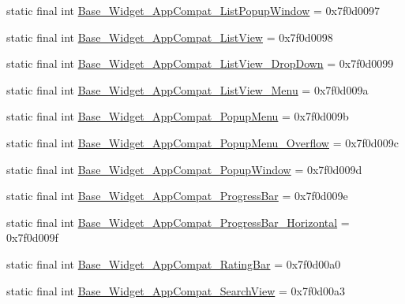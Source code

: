 \begin{DoxyCompactItemize}
\item 
static final int \mbox{\hyperlink{classcom_1_1google_1_1android_1_1gms_1_1R_1_1style_a2879810d1da9cff366d9760349a6dac1}{Base\+\_\+\+Widget\+\_\+\+App\+Compat\+\_\+\+List\+Popup\+Window}} = 0x7f0d0097
\item 
static final int \mbox{\hyperlink{classcom_1_1google_1_1android_1_1gms_1_1R_1_1style_aec68a06e39987a5999403a6330283522}{Base\+\_\+\+Widget\+\_\+\+App\+Compat\+\_\+\+List\+View}} = 0x7f0d0098
\item 
static final int \mbox{\hyperlink{classcom_1_1google_1_1android_1_1gms_1_1R_1_1style_a17f9de7731dbc01e32dfddc0e70ba35e}{Base\+\_\+\+Widget\+\_\+\+App\+Compat\+\_\+\+List\+View\+\_\+\+Drop\+Down}} = 0x7f0d0099
\item 
static final int \mbox{\hyperlink{classcom_1_1google_1_1android_1_1gms_1_1R_1_1style_a1bac6335025d5943cd9355c7a14357ad}{Base\+\_\+\+Widget\+\_\+\+App\+Compat\+\_\+\+List\+View\+\_\+\+Menu}} = 0x7f0d009a
\item 
static final int \mbox{\hyperlink{classcom_1_1google_1_1android_1_1gms_1_1R_1_1style_a421ef42bd285d8d2687a913dfab14ac5}{Base\+\_\+\+Widget\+\_\+\+App\+Compat\+\_\+\+Popup\+Menu}} = 0x7f0d009b
\item 
static final int \mbox{\hyperlink{classcom_1_1google_1_1android_1_1gms_1_1R_1_1style_ae33e454e1ec9185db9346b83943c0f72}{Base\+\_\+\+Widget\+\_\+\+App\+Compat\+\_\+\+Popup\+Menu\+\_\+\+Overflow}} = 0x7f0d009c
\item 
static final int \mbox{\hyperlink{classcom_1_1google_1_1android_1_1gms_1_1R_1_1style_a6b73087474cde7c1dc41f69078c44af6}{Base\+\_\+\+Widget\+\_\+\+App\+Compat\+\_\+\+Popup\+Window}} = 0x7f0d009d
\item 
static final int \mbox{\hyperlink{classcom_1_1google_1_1android_1_1gms_1_1R_1_1style_ac3fc1fb98e6c0625d03efcbd589ed174}{Base\+\_\+\+Widget\+\_\+\+App\+Compat\+\_\+\+Progress\+Bar}} = 0x7f0d009e
\item 
static final int \mbox{\hyperlink{classcom_1_1google_1_1android_1_1gms_1_1R_1_1style_a43d07cecec0fd5937784641e2f2e4766}{Base\+\_\+\+Widget\+\_\+\+App\+Compat\+\_\+\+Progress\+Bar\+\_\+\+Horizontal}} = 0x7f0d009f
\item 
static final int \mbox{\hyperlink{classcom_1_1google_1_1android_1_1gms_1_1R_1_1style_ad39e3bbe19ff9e0d4e2a6c0e23aaf7cb}{Base\+\_\+\+Widget\+\_\+\+App\+Compat\+\_\+\+Rating\+Bar}} = 0x7f0d00a0
\item 
static final int \mbox{\hyperlink{classcom_1_1google_1_1android_1_1gms_1_1R_1_1style_a3e1f56fd1fc8289db12097cc79bd657d}{Base\+\_\+\+Widget\+\_\+\+App\+Compat\+\_\+\+Search\+View}} = 0x7f0d00a3

\end{DoxyCompactItemize}
